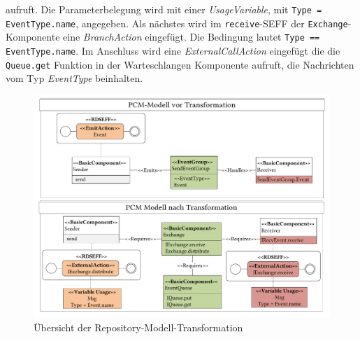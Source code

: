 aufruft. Die Parameterbelegung wird mit einer \emph{UsageVariable}, mit \texttt{Type = EventType.name}, angegeben. Als nächstes wird im \texttt{receive}-SEFF der \texttt{Exchange}-Komponente eine \emph{BranchAction} eingefügt. Die Bedingung lautet \texttt{Type == EventType.name}. Im Anschluss wird eine \emph{ExternalCallAction} eingefügt die die \texttt{Queue.get} Funktion in der Warteschlangen Komponente aufruft, die Nachrichten vom Typ \emph{EventType} beinhalten.

\begin{figure}
\center
  \includegraphics[width=1.3\textwidth, angle=90]{images/transformation/transformationRepository.pdf}
  \caption{Übersicht der Repository-Modell-Transformation}
  \label{img:transformationRepository}
\end{figure}



